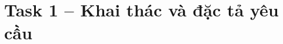 \documentclass[12pt,a4paper]{article}
\begin{document}
\section{Task 1 -- Khai thác và đặc tả yêu cầu}

\end{document}
